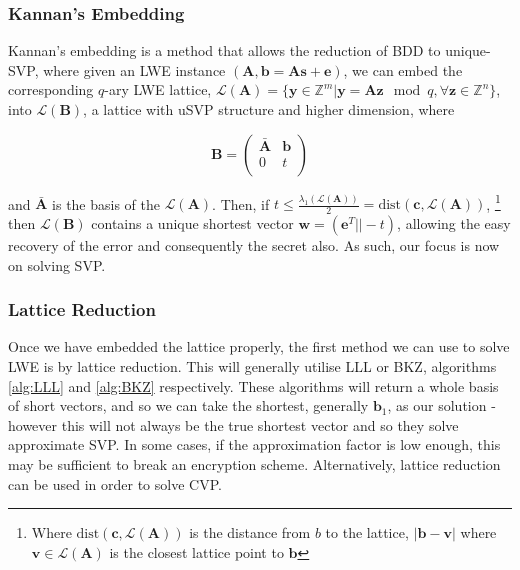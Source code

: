 \documentclass[a4paper, 10pt]{article}
\theoremstyle{definition}
\begin{document}
\subsubsection{Kannan's Embedding}

Kannan's embedding \cite{Kannan1987MinkowskisCB} is a method that allows the reduction of \ac{BDD} to unique-\ac{SVP}, where given an LWE instance $(\mathbf{A}, \mathbf{b} = \mathbf{As+e})$, we can embed the corresponding $q$-ary LWE lattice, $\mathcal{L}(\mathbf{A}) = \{\mathbf{y} \in \mathbb{Z}^m | \mathbf{y} = \mathbf{Az} \mod{q}, \forall \mathbf{z}\in \mathbb{Z}^n\}$, into $\mathcal{L}(\mathbf{B})$, a lattice with u\ac{SVP} structure and higher dimension, where 

\[\mathbf{B} = 
\begin{pmatrix}
    \bar{\mathbf{A}} & \mathbf{b}\\
    0 & t\\
\end{pmatrix}\]

and $\bar{\mathbf{A}}$ is the basis of the $\mathcal{L}(\mathbf{A})$. Then, if $t \leq \frac{\lambda_1(\mathcal{L}(\mathbf{A}))}{2} = \mbox{dist}(\mathbf{c}, \mathcal{L}(\mathbf{A}))$, \footnote{Where $\mbox{dist}(\mathbf{c}, \mathcal{L}(\mathbf{A}))$ is the distance from $b$ to the lattice, $|\mathbf{b} - \mathbf{v}|$ where $\mathbf{v}\in \mathcal{L}(\mathbf{A})$ is the closest lattice point to $\mathbf{b}$} then $\mathcal{L}(\mathbf{B})$ contains a unique shortest vector $\mathbf{w} = (\mathbf{e}^T || -t)$, allowing the easy recovery of the error and consequently the secret also. As such, our focus is now on solving \ac{SVP}.

\subsubsection{Lattice Reduction}

Once we have embedded the lattice properly, the first method we can use to solve \ac{LWE} is by lattice reduction. This will generally utilise \ac{LLL} or \ac{BKZ}, algorithms \ref{alg:LLL} and \ref{alg:BKZ} respectively. These algorithms will return a whole basis of short vectors, and so we can take the shortest, generally $\mathbf{b}_1$, as our solution - however this will not always be the true shortest vector and so they solve approximate \ac{SVP}. In some cases, if the approximation factor is low enough, this may be sufficient to break an encryption scheme. Alternatively, lattice reduction can be used in order to solve \ac{CVP}. 
\end{document}
